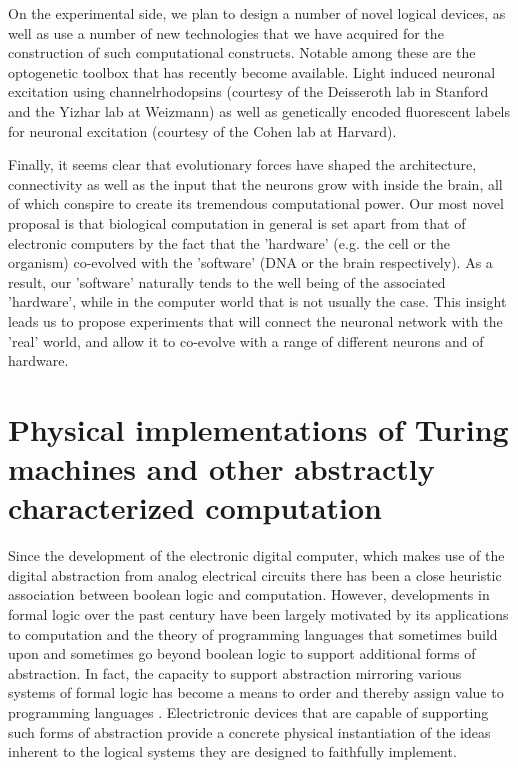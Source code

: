 On the experimental side, we plan to design a number of novel logical devices, as well as use a number of new technologies that we have acquired for the construction of such computational constructs. Notable among these are the optogenetic toolbox that has recently become available. Light induced neuronal excitation using channelrhodopsins (courtesy of the Deisseroth lab in Stanford and the Yizhar lab at Weizmann) as well as genetically encoded fluorescent labels for neuronal excitation (courtesy of the Cohen lab at Harvard).

 Finally, it seems clear that evolutionary forces have shaped the architecture, connectivity as well as the input that the neurons grow with inside the brain, all of which conspire to create its tremendous computational power. Our most novel proposal is that  biological computation in general is set apart from that of electronic computers by the fact that the 'hardware' (e.g. the cell or the organism) co-evolved with the 'software' (DNA or the brain respectively). As a result, our 'software' naturally tends to the well being of the associated 'hardware', while in the computer world that is not usually the case. This insight leads us to propose experiments that will connect the neuronal network with the 'real' world, and  allow it to co-evolve with a range of different neurons and of hardware.






\section{Physical implementations of Turing machines and other abstractly characterized
computation}

Since the development of the electronic digital computer, which makes
use of the digital abstraction \cite{Ward1989} from analog electrical circuits
there has been a close heuristic association between boolean logic and
computation. However, developments in formal logic over the past century
have been largely motivated by its applications to computation and the
theory of programming languages that sometimes build upon and sometimes
go beyond boolean logic to support additional forms of abstraction. In
fact, the capacity to support abstraction mirroring various systems of
formal logic has become a means to order and thereby assign value to
programming languages \cite{Abelson1996}. Electrictronic devices that are capable
of supporting such forms of abstraction provide a concrete physical
instantiation of the ideas inherent to the logical systems they are
designed to faithfully implement.

